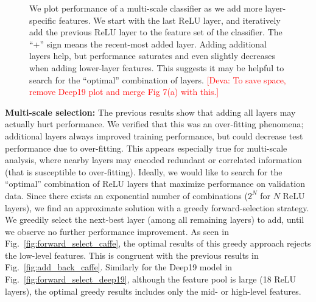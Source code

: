 \documentclass[10pt,twocolumn,letterpaper]{article}
\newcommand{\deva}[1]{\textcolor{red}{[Deva: #1]}}
\begin{document}
\begin{figure}[t!]
\centering
\caption{We plot performance of a multi-scale classifier as we add more layer-specific features. We start with the last ReLU layer, and iteratively add the previous ReLU layer to the feature set of the classifier.
The ``+'' sign means the recent-most added layer. Adding additional layers help, but performance saturates and even slightly decreases when adding lower-layer features. This suggests it may be helpful to search for the ``optimal'' combination of layers. \deva{To save space, remove Deep19 plot and merge Fig 7(a) with this.}}
\label{fig:add_back}
\end{figure}

{\bf Multi-scale selection:} The previous results show that adding all layers may actually hurt performance. We verified that this was an over-fitting phenomena; additional layers always improved training performance, but could decrease test performance due to over-fitting. This appears especially true for multi-scale analysis, where nearby layers may encoded redundant or correlated information (that is susceptible to over-fitting). Ideally, we would like to search for the ``optimal'' combination of ReLU layers that maximize performance on validation data. Since there exists an exponential number of combinations ($2^N$ for $N$ ReLU layers), we find an approximate solution with a greedy forward-selection strategy. We greedily select the next-best layer (among all remaining layers) to add, until we observe no further performance improvement. As seen in Fig.~\ref{fig:forward_select_caffe}, the optimal results of this greedy approach rejects the low-level features. This is congruent with the previous results in Fig.~\ref{fig:add_back_caffe}. Similarly for the Deep19 model in Fig.~\ref{fig:forward_select_deep19}, although the feature pool is large (18 ReLU layers), the optimal greedy results includes only the mid- or high-level features. 
\end{document}
